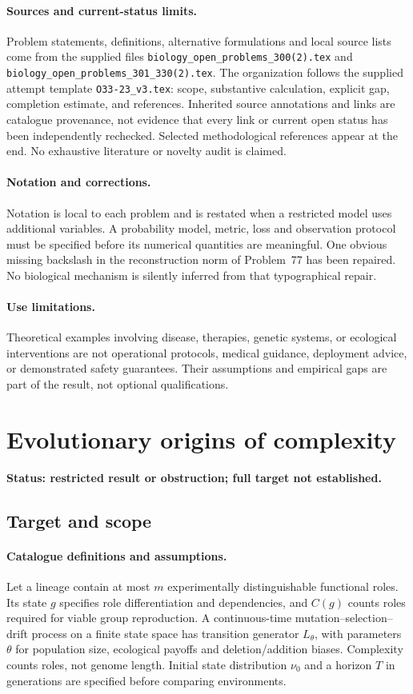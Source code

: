 \documentclass[11pt]{article}
\begin{document}
\paragraph{Sources and current-status limits.}
Problem statements, definitions, alternative formulations and local source lists
come from the supplied files
\texttt{biology\_open\_problems\_300(2).tex} and
\texttt{biology\_open\_problems\_301\_330(2).tex}.
The organization follows the supplied attempt template
\texttt{O33-23\_v3.tex}: scope, substantive calculation, explicit gap,
completion estimate, and references. Inherited source annotations and links are
catalogue provenance, not evidence that every link or current open status has
been independently rechecked. Selected methodological references appear at the
end. No exhaustive literature or novelty audit is claimed.

\paragraph{Notation and corrections.}
Notation is local to each problem and is restated when a restricted model uses
additional variables. A probability model, metric, loss and observation protocol
must be specified before its numerical quantities are meaningful. One obvious
missing backslash in the reconstruction norm of Problem~77 has been repaired.
No biological mechanism is silently inferred from that typographical repair.

\paragraph{Use limitations.}
Theoretical examples involving disease, therapies, genetic systems, or ecological
interventions are not operational protocols, medical guidance, deployment advice,
or demonstrated safety guarantees. Their assumptions and empirical gaps are part
of the result, not optional qualifications.


\section*{Evolutionary origins of complexity}
\label{prob:157}
\noindent\textbf{Status: restricted result or obstruction; full target not established.}
\subsection{Target and scope}
\paragraph{Catalogue definitions and assumptions.}
Let a lineage contain at most $m$ experimentally distinguishable functional roles. Its state $g$ specifies role differentiation and dependencies, and $C(g)$ counts roles required for viable group reproduction. A continuous-time mutation--selection--drift process on a finite state space has transition generator $L_\theta$, with parameters $\theta$ for population size, ecological payoffs and deletion/addition biases. Complexity counts roles, not genome length. Initial state distribution $\nu_0$ and a horizon $T$ in generations are specified before comparing environments.
\end{document}
